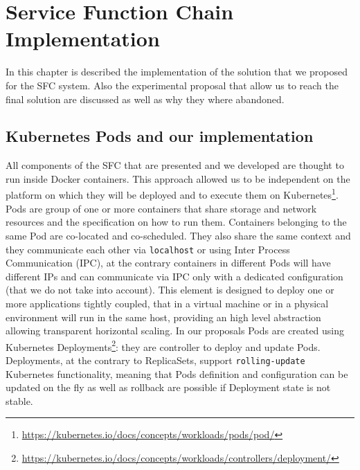 \chapter{Service Function Chain Implementation}
\label{chap:impl}

\newcommand{\enchainer}{\texttt{Enchainer}}
\newcommand{\vnf}{\texttt{VNF}}
\newcommand{\vnfs}{\texttt{VNFs}}
\newcommand{\dispatcher}{\texttt{Dispatcher}}
\newcommand{\astaire}{\texttt{Astaire}}
\newcommand{\ironhide}{\texttt{Ironhide}}
\newcommand{\harbor}{\texttt{Harbor}}
\newcommand{\roulette}{\texttt{Roulette}}
\newcommand{\ingress}{\texttt{ingress}}
\newcommand{\ingresses}{\texttt{ingresses}}
\newcommand{\egress}{\texttt{egress}}
\newcommand{\egresses}{\texttt{egresses}}

In this chapter is described the implementation of the solution that we
proposed for the SFC system. Also the experimental proposal that allow us
to reach the final solution are discussed as well as why they where abandoned.

\section{Kubernetes Pods and our implementation}
All components of the SFC that are presented and we developed are thought to
run inside Docker containers. This approach allowed us to be independent on the
platform on which they will be deployed and to execute them on
Kubernetes\footnote{\url{https://kubernetes.io/docs/concepts/workloads/pods/pod/}}.
Pods are group of one or more containers that share storage and network
resources and the specification on how to run them. Containers belonging to the
same Pod are co-located and co-scheduled. They also share the same context and
they communicate each other via \texttt{localhost} or using Inter Process
Communication (IPC), at the contrary containers in different Pods will have
different IPs and can communicate via IPC only with a dedicated configuration
(that we do not take into account). This element is designed to deploy one or
more applications tightly coupled, that in a virtual machine or in a
physical environment will run in the same host, providing an high level
abstraction allowing transparent horizontal scaling. In our proposals Pods are
created using Kubernetes
Deployments\footnote{\url{https://kubernetes.io/docs/concepts/workloads/controllers/deployment/}}:
they are controller to deploy and update Pods. Deployments, at the contrary to
ReplicaSets, support \texttt{rolling-update} Kubernetes functionality, meaning
that Pods definition and configuration can be updated on the fly as well as
rollback are possible if Deployment state is not stable. 

